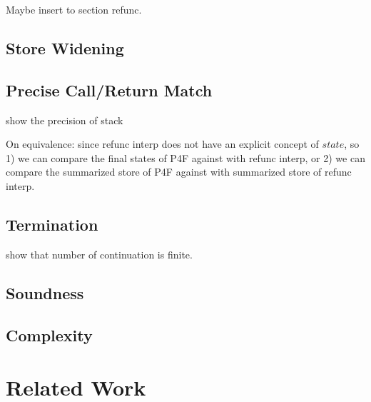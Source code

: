 \documentclass[acmsmall,review,anonymous]{acmart}\settopmatter{printfolios=true,printccs=false,printacmref=false}
\begin{document}
Maybe insert to section refunc.

\subsection{Store Widening}

\subsection{Precise Call/Return Match}

show the precision of stack

On equivalence: since refunc interp does not have an explicit concept of $state$,
so 1) we can compare the final states of P4F against with refunc interp,
or 2) we can compare the summarized store of P4F against with summarized store of refunc interp.

\subsection{Termination}

show that number of continuation is finite.

\subsection{Soundness}

\subsection{Complexity}


\section{Related Work}\label{sec:related}
\end{document}

